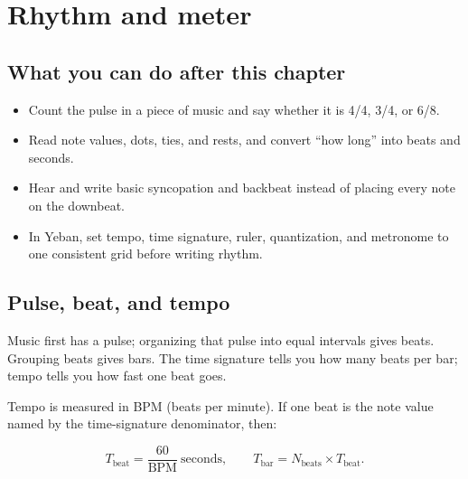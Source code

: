 \chapter{Rhythm and meter}


\label{sec:rhythm-and-meter}

\section*{What you can do after this chapter}
\begin{itemize}
  \item Count the pulse in a piece of music and say whether it is 4/4, 3/4, or 6/8.
  \item Read note values, dots, ties, and rests, and convert ``how long'' into beats and seconds.
  \item Hear and write basic syncopation and backbeat instead of placing every note on the downbeat.
  \item In Yeban, set tempo, time signature, ruler, quantization, and metronome to one consistent grid before writing rhythm.
\end{itemize}

\section{Pulse, beat, and tempo}

Music first has a pulse; organizing that pulse into equal intervals gives beats. Grouping beats gives bars. The time signature tells you how many beats per bar; tempo tells you how fast one beat goes.

Tempo is measured in BPM (beats per minute). If one beat is the note value named by the time-signature denominator, then:

\begin{equation}
  T_{\text{beat}} = \frac{60}{\mathrm{BPM}}\ \text{seconds},
  \qquad
  T_{\text{bar}} = N_{\text{beats}} \times T_{\text{beat}}.
  \label{eq:beat-duration}
\end{equation}

